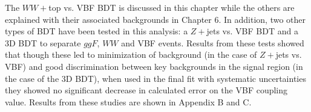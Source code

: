 The $WW+$top vs. VBF BDT is discussed in this chapter while the others are explained with their associated backgrounds in Chapter 6. In addition, two other types of BDT have been tested in this analysis: a $Z+$jets vs. VBF BDT and a 3D BDT to separate $ggF$, $WW$ and VBF events. Results from these tests showed that though these led to minimization of background (in the case of $Z+$jets vs. VBF) and good discrimination between key backgrounds in the signal region (in the case of the 3D BDT), when used in the final fit with systematic uncertainties they showed no significant decrease in calculated error on the VBF coupling value. Results from these studies are shown in Appendix B and C.
%

